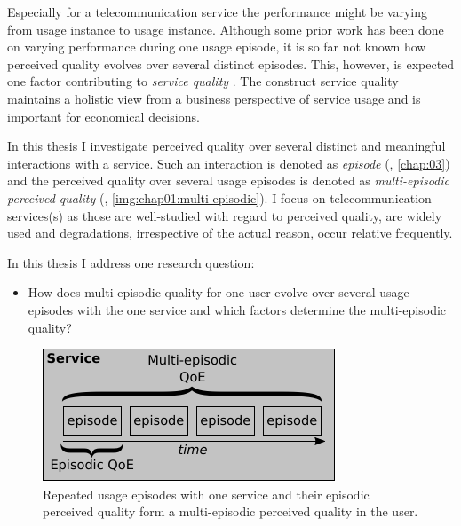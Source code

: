 Especially for a telecommunication service the performance might be varying from usage instance to usage instance.
Although some prior work has been done on varying performance during one usage episode, it is so far not known how perceived quality evolves over several distinct episodes.
This, however, is expected one factor contributing to \emph{service quality} \citep[\cf,][]{zeithaml_behavioral_1996}.
The construct service quality maintains a holistic view from a business perspective of service usage and is important for economical decisions.

In this thesis I investigate perceived quality over several distinct and meaningful interactions with a service.
Such an interaction is denoted as \emph{episode} (\cf, \autoref{chap:03}) and the perceived quality over several usage episodes is denoted as \emph{multi-episodic perceived quality} (\cf, \autoref{img:chap01:multi-episodic}).
I focus on telecommunication services(s) as those are well-studied with regard to perceived quality, are widely used and degradations, irrespective of the actual reason, occur relative frequently.

In this thesis I address one research question: \\
\begin{itemize}
\item How does multi-episodic quality for one user evolve over several usage episodes with the one service and which factors determine the multi-episodic quality?
\end{itemize}

\begin{figure}
	\centering
	\includegraphics[width=0.6\columnwidth]{figure/multi-episodic}
	\caption{Repeated usage episodes with one service and their episodic perceived quality form a multi-episodic perceived quality in the user.}
	\label{img:chap01:multi-episodic}
\end{figure}

